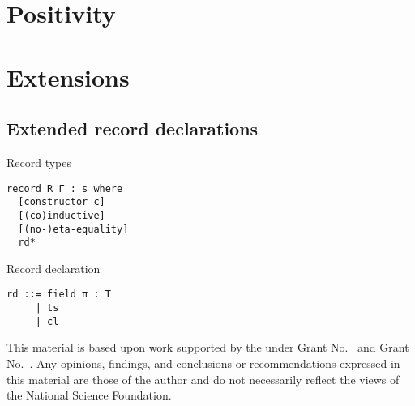 \documentclass[acmlarge]{acmart}\settopmatter{}
\begin{document}
\section{Positivity}
\label{sec:positivity}

\section{Extensions}
\label{sec:extensions}

\subsection{Extended record declarations}

Record types
\begin{verbatim}
record R Γ : s where
  [constructor c]
  [(co)inductive]
  [(no-)eta-equality]
  rd*
\end{verbatim}

Record declaration
\begin{verbatim}
rd ::= field π : T
     | ts
     | cl 
\end{verbatim}


\begin{acks}                            %
  This material is based upon work supported by the
   under Grant
  No.~ and Grant
  No.~.  Any opinions, findings, and
  conclusions or recommendations expressed in this material are those
  of the author and do not necessarily reflect the views of the
  National Science Foundation.
\end{acks}


%


\end{document}

